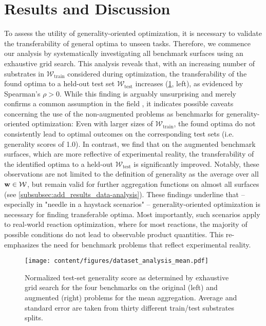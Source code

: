 \section{Results and Discussion} \label{sec:results}

To assess the utility of generality-oriented optimization, it is necessary to validate the transferability of general optima to unseen tasks. Therefore, we commence our analysis by systematically investigating all benchmark surfaces using an exhaustive grid search. This analysis reveals that, with an increasing number of substrates in $\mathcal{W}_{\text{train}}$ considered during optimization, the transferability of the found optima to a held-out test set $\mathcal{W}_{\text{test}}$ increases (\cref{fig:results_dataset-analysis}, left), as evidenced by Spearman's $\rho > 0$.
While this finding is arguably unsurprising and merely confirms a common assumption in the field \citep{wagen_screening_2022}, it indicates possible caveats concerning the use of the non-augmented problems as benchmarks for generality-oriented optimization: 
Even with larger sizes of $\mathcal{W}_{\text{train}}$, the found optima do not consistently lead to optimal outcomes on the corresponding test sets (i.e. generality scores of 1.0). 
In contrast, we find that on the augmented benchmark surfaces, which are more reflective of experimental reality, the transferability of the identified optima to a held-out $\mathcal{W}_{\text{test}}$ is significantly improved.
Notably, these observations are not limited to the definition of generality as the average over all ${\mathbf{w}} \in {\mathcal{W}}$, but remain valid for further aggregation functions on almost all surfaces (see \cref{subsubsec:add_results_data-analysis}).
These findings underline that – especially in "needle in a haystack scenarios" – generality-oriented optimization is necessary for finding transferable optima. 
Most importantly, such scenarios apply to real-world reaction optimization, where for most reactions, the majority of possible conditions do not lead to observable product quantities. 
This re-emphasizes the need for benchmark problems that reflect experimental reality.

\begin{figure}[t]
    \centering
    \texttt{[image: content/figures/dataset\_analysis\_mean.pdf]}
    
    \vspace{-1em}
    
    \caption{
    Normalized test-set generality score as determined by exhaustive grid search for the four benchmarks on the original (left) and augmented (right) problems for the mean aggregation. Average and standard error are taken from thirty different train/test substrates splits.
    }
    \label{fig:results_dataset-analysis}
\end{figure}

